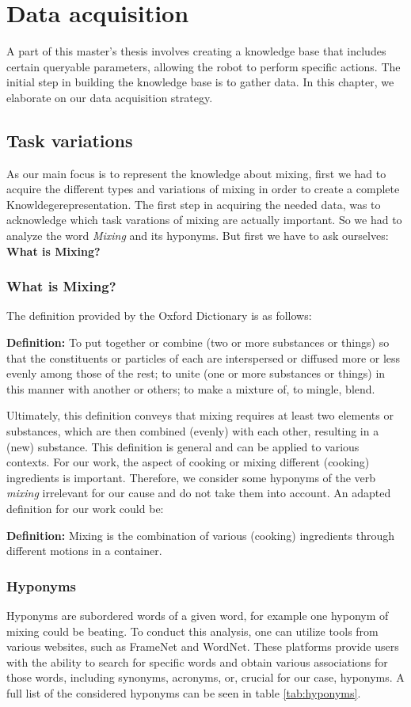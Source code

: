 \chapter*{Data acquisition}

A part of this master's thesis involves creating a knowledge base that includes certain queryable parameters, allowing the robot to perform specific actions. The initial step in building the knowledge base is to gather data. In this chapter, we elaborate on our data acquisition strategy.
\section*{Task variations}
	As our main focus is to represent the knowledge about mixing, first we had to acquire the different types and variations of mixing in order to create a complete Knowldegerepresentation. The first step in acquiring the needed data, was to acknowledge which task varations of mixing are actually important. 
  So we had to analyze the word \textit{Mixing} and its hyponyms. But first we have to ask ourselves: \textbf{What is Mixing?}
  \subsection*{What is Mixing?}
  The definition provided by the Oxford Dictionary \cite{Oxford} is as follows:
  
  \textbf{Definition:} To put together or combine (two or more substances or things) so that the constituents or particles of each are interspersed or diffused more or less evenly among those of the rest; to unite (one or more substances or things) in this manner with another or others; to make a mixture of, to mingle, blend.

  Ultimately, this definition conveys that mixing requires at least two elements or substances, which are then combined (evenly) with each other, resulting in a (new) substance.
  This definition is general and can be applied to various contexts. For our work, the aspect of cooking or mixing different (cooking) ingredients is important. Therefore, we consider some hyponyms of the verb \textit{mixing} irrelevant for our cause and do not take them into account.
  An adapted definition for our work could be: 
  
  \textbf{Definition:} Mixing is the combination of various (cooking) ingredients through different motions in a container.
  
  \subsection*{Hyponyms} 
	Hyponyms are subordered words of a given word, for example one hyponym of mixing could be beating. 
  To conduct this analysis, one can utilize tools from various websites, such as FrameNet\cite{FrameNet} and WordNet\cite{WordNet}. These platforms provide users with the ability to search for specific words and obtain various associations for those words, including synonyms, acronyms, or, crucial for our case, hyponyms.	
  A full list of the considered hyponyms can be seen in table \ref{tab:hyponyms}.
